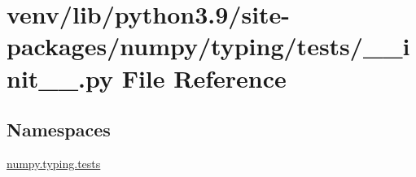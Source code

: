 \hypertarget{venv_2lib_2python3_89_2site-packages_2numpy_2typing_2tests_2____init_____8py}{}\section{venv/lib/python3.9/site-\/packages/numpy/typing/tests/\+\_\+\+\_\+init\+\_\+\+\_\+.py File Reference}
\label{venv_2lib_2python3_89_2site-packages_2numpy_2typing_2tests_2____init_____8py}
\subsection*{Namespaces}
\begin{DoxyCompactItemize}
\item 
 \hyperlink{namespacenumpy_1_1typing_1_1tests}{numpy.\+typing.\+tests}
\end{DoxyCompactItemize}
